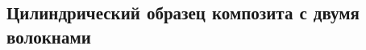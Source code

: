 \begin{russian}
%
%
%
%
%

\subsection{Цилиндрический образец композита с двумя волокнами}


\end{russian}
